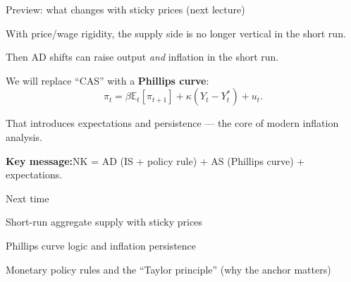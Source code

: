 \documentclass[aspectratio=169,xcolor=dvipsnames]{beamer}
\let\tempone\itemize
\let\temptwo\enditemize
\renewenvironment{itemize}{\tempone\addtolength{\itemsep}{\fill}}{\temptwo}
\begin{document}
\begin{frame}{Preview: what changes with sticky prices (next lecture)}
\begin{itemize}
\item With price/wage rigidity, the supply side is no longer vertical in the short run.
\item Then AD shifts can raise output \emph{and} inflation in the short run.
\item We will replace ``CAS'' with a \textbf{Phillips curve}:
\[
\pi_t = \beta \mathbb{E}_t[\pi_{t+1}] + \kappa (Y_t - Y_t^{*}) + u_t.
\]
\item That introduces expectations and persistence --- the core of modern inflation analysis.
\end{itemize}

\vspace{0.3em}
\textbf{Key message:}\quad NK = AD (IS + policy rule) + AS (Phillips curve) + expectations.
\end{frame}

\begin{frame}{Next time}
\Large
\begin{itemize}
\item Short-run aggregate supply with sticky prices
\item Phillips curve logic and inflation persistence
\item Monetary policy rules and the ``Taylor principle'' (why the anchor matters)
\end{itemize}
\end{frame}
\end{document}
